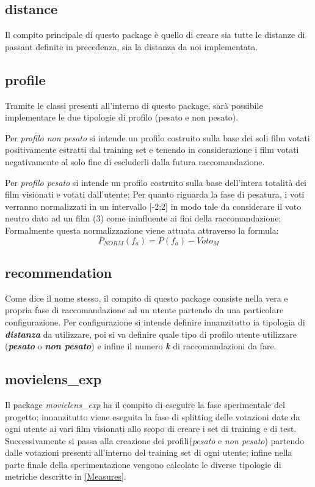\subsection{distance}
Il compito principale di questo package è quello di creare sia tutte le distanze di passant definite in precedenza, sia la distanza da noi implementata.
\subsection{profile}
Tramite le classi presenti all'interno di questo package, sarà possibile implementare le due tipologie di profilo (pesato e non pesato).

Per \emph{profilo non pesato} si intende un profilo costruito sulla base dei soli film votati positivamente estratti dal training set e tenendo in considerazione i film votati negativamente al solo fine di escluderli dalla futura raccomandazione.

Per \emph{profilo pesato} si intende un profilo costruito sulla base dell'intera totalità dei film visionati e votati dall'utente; Per quanto riguarda la fase di pesatura, i voti verranno normalizzati in un intervallo [-2;2] in modo tale da considerare il voto neutro dato ad un film (3) come ininfluente ai fini della raccomandazione; Formalmente questa normalizzazione viene attuata attraverso la formula:
$$
P_{NORM}(f_a) = P(f_a)- Voto_M
$$
\subsection{recommendation}
Come dice il nome stesso, il compito di questo package consiste nella vera e propria fase di raccomandazione ad un utente partendo da una particolare configurazione. Per configurazione si intende definire innanzitutto ia tipologia di \emph{\textbf{distanza}} da utilizzare, poi si va definire quale tipo di profilo utente utilizzare (\emph{\textbf{pesato}} o \emph{\textbf{non pesato}}) e infine il numero \emph{\textbf{k}} di raccomandazioni da fare.
\subsection{movielens\_exp}
Il package \emph{movielens\_exp} ha il compito di eseguire la fase sperimentale del progetto; innanzitutto viene eseguita la fase di splitting delle votazioni date da ogni utente ai vari film visionati allo scopo di creare i set di training e di test. Successivamente si passa alla creazione dei profili(\emph{pesato} e \emph{non pesato}) partendo dalle votazioni presenti all'interno del training set di ogni utente; infine nella parte finale della sperimentazione vengono calcolate le diverse tipologie di metriche descritte in \ref{Measures}.

